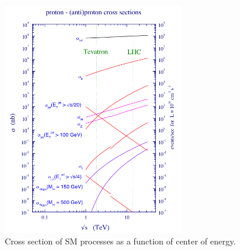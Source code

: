 \begin{figure}[!hb]
\centering
  \includegraphics[width=0.7\textwidth]{Plots/SM/SMxsec}
  \caption{ Cross section of SM processes as a function of center of energy.
  ~\cite{smxsec}
  }
  \label{fig:sm_xsec}
\end{figure}
